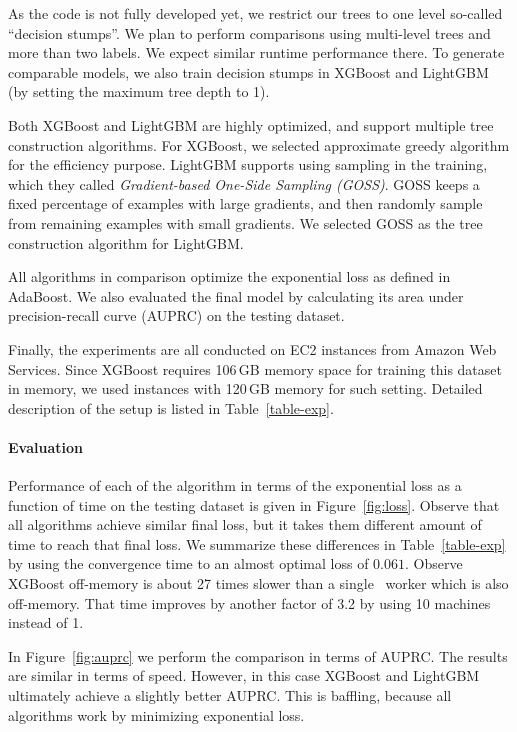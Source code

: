 As the code is not fully developed yet, we restrict our trees to one
level so-called ``decision stumps''. We plan to perform comparisons
using multi-level trees and more than two labels. We expect similar
runtime performance there. To generate comparable models,
we also train decision stumps in XGBoost and LightGBM
(by setting the maximum tree depth to 1).

Both XGBoost and LightGBM are highly optimized, and support multiple
tree construction algorithms.
For XGBoost, we selected approximate greedy algorithm for the efficiency purpose.
LightGBM supports using sampling in the training,
which they called \textit{Gradient-based One-Side Sampling (GOSS)}.
GOSS keeps a fixed percentage of examples with large gradients,
and then randomly sample from remaining examples with small gradients.
We selected GOSS as the tree construction algorithm for LightGBM.

All algorithms in comparison optimize the exponential loss as defined in AdaBoost.
We also evaluated the final model by calculating its area under precision-recall
curve (AUPRC) on the testing dataset.

Finally, the experiments are all conducted on EC2 instances from Amazon Web Services.
Since XGBoost requires 106\,GB memory space for training this dataset in memory,
we used instances with 120\,GB memory for such setting.
Detailed description of the setup is listed in Table~\ref{table-exp}.

\paragraph{Evaluation}
Performance of each of the algorithm in terms of
the exponential loss as a function of time on the testing dataset is given in
Figure~\ref{fig:loss}. Observe that all algorithms achieve similar
final loss, but it takes them different amount of time to reach that
final loss. We summarize these differences in Table~\ref{table-exp} by
using the convergence time to an almost optimal loss of
$0.061$. Observe  XGBoost off-memory is about 27
times slower than a single \Sparrow\ worker which is also off-memory. That
time improves by another factor of 3.2 by using 10 machines instead of 1.

In Figure~\ref{fig:auprc} we perform the comparison in terms of
AUPRC. The results are similar in terms of speed. However, in this
case XGBoost and LightGBM ultimately achieve a slightly better
AUPRC. This is baffling, because all algorithms work by minimizing
exponential loss.

